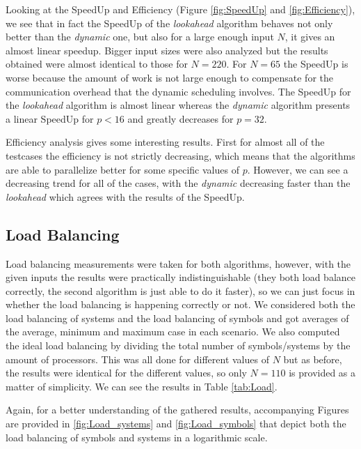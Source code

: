 \documentclass[letterpaper,twoside,11pt]{article}
\begin{document}
\begin{multicols}{2}
Looking at the SpeedUp and Efficiency (Figure \ref{fig:SpeedUp} and \ref{fig:Efficiency}), we see that in fact the SpeedUp of the \emph{lookahead} algorithm behaves not only better than the \emph{dynamic} one, but also for a large enough input $N$, it gives an almost linear speedup. Bigger input sizes were also analyzed but the results obtained were almost identical to those for $N = 220$. For $N=65$ the SpeedUp is worse because the amount of work is not large enough to compensate for the communication overhead that the dynamic scheduling involves. The SpeedUp for the \emph{lookahead} algorithm is almost linear whereas the \emph{dynamic} algorithm presents a linear SpeedUp for $p < 16$ and greatly decreases for $p = 32$.

Efficiency analysis gives some interesting results. First for almost all of the testcases the efficiency is not strictly decreasing, which means that the algorithms are able to parallelize better for some specific values of $p$. However, we can see a decreasing trend for all of the cases, with the \emph{dynamic} decreasing faster than the \emph{lookahead} which agrees with the results of the SpeedUp.


\subsection{Load Balancing} %
\label{sub:load_balancing}

Load balancing measurements were taken for both algorithms, however, with the given inputs the results were practically indistinguishable (they both load balance correctly, the second algorithm is just able to do it faster), so we can just focus in whether the load balancing is happening correctly or not. We considered both the load balancing of systems and the load balancing of symbols and got averages of the average, minimum and maximum case in each scenario. We also computed the ideal load balancing by dividing the total number of symbols/systems by the amount of processors. This was all done for different values of $N$ but as before, the results were identical for the different values, so only $N = 110$ is provided as a matter of simplicity. We can see the results in Table \ref{tab:Load}.

Again, for a better understanding of the gathered results, accompanying Figures are provided in \ref{fig:Load_systems} and \ref{fig:Load_symbols} that depict both the load balancing of symbols and systems in a logarithmic scale.


\end{multicols}
\end{document}
